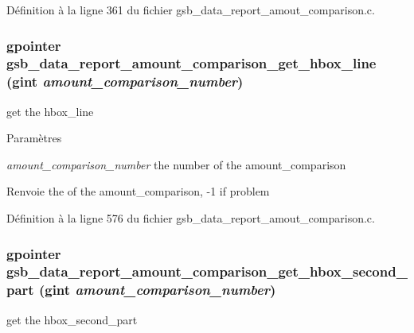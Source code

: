 Définition à la ligne 361 du fichier gsb\_\-data\_\-report\_\-amout\_\-comparison.c.

\subsubsection[{gsb\_\-data\_\-report\_\-amount\_\-comparison\_\-get\_\-hbox\_\-line}]{\setlength{\rightskip}{0pt plus 5cm}gpointer gsb\_\-data\_\-report\_\-amount\_\-comparison\_\-get\_\-hbox\_\-line (gint {\em amount\_\-comparison\_\-number})}\label{gsb__data__report__amout__comparison_8h_a16f1b40f708722b5b69378fe06846b06}
get the hbox\_\-line


\begin{DoxyParams}{Paramètres}
\item[{\em amount\_\-comparison\_\-number}]the number of the amount\_\-comparison\end{DoxyParams}
\begin{DoxyReturn}{Renvoie}
the of the amount\_\-comparison, -\/1 if problem 
\end{DoxyReturn}


Définition à la ligne 576 du fichier gsb\_\-data\_\-report\_\-amout\_\-comparison.c.

\subsubsection[{gsb\_\-data\_\-report\_\-amount\_\-comparison\_\-get\_\-hbox\_\-second\_\-part}]{\setlength{\rightskip}{0pt plus 5cm}gpointer gsb\_\-data\_\-report\_\-amount\_\-comparison\_\-get\_\-hbox\_\-second\_\-part (gint {\em amount\_\-comparison\_\-number})}\label{gsb__data__report__amout__comparison_8h_a820deaa79a40b8b64515c7fd8815c97e}
get the hbox\_\-second\_\-part


